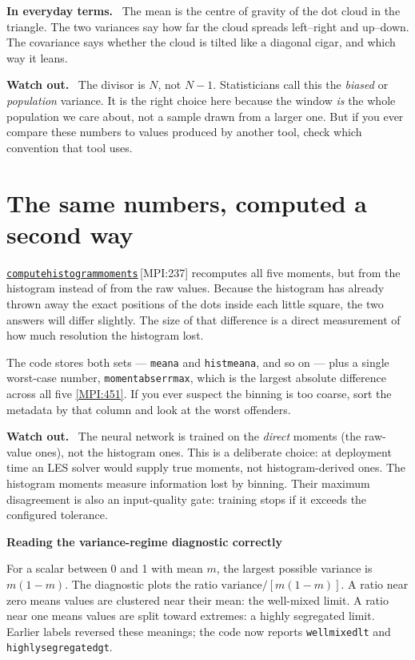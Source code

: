 \documentclass[11pt,a4paper]{report}
\newcommand{\srcbase}{vscode://file/Users/syellapa/Documents/Research/2026/ANSYS/Multi-ScalarPDF}
\newcommand{\srctag}[1]{{\footnotesize\textcolor{TagGray}{[#1]}}}
\newcommand{\Mpi}[2]{\href{\srcbase/EnsightPDFHybridDatasetMPI.py:#1}{\texttt{#2}}\,\srctag{MPI:#1}}
\newcommand{\MpiL}[1]{\href{\srcbase/EnsightPDFHybridDatasetMPI.py:#1}{\srctag{MPI:#1}}}
\newcommand{\code}[1]{\texttt{#1}}
\renewcommand{\_}{\origtextunderscore\allowbreak}
\newlength{\calloutwidth}
\newcommand{\calloutOpen}{%
  \par\medskip\noindent
  \setlength{\calloutwidth}{\dimexpr\linewidth-2\fboxsep\relax}%
  \begin{lrbox}{\calloutbox}\begin{minipage}{\calloutwidth}}
\newcommand{\calloutClose}[1]{%
  \end{minipage}\end{lrbox}\colorbox{#1}{\usebox{\calloutbox}}\par\medskip}
\newenvironment{plainbox}[1]
  {\calloutOpen\textbf{#1}\par\medskip}
  {\calloutClose{BoxBG}}
\newenvironment{analogy}
  {\calloutOpen\textbf{In everyday terms.}\ }
  {\calloutClose{BoxBG}}
\newenvironment{caution}
  {\calloutOpen\textbf{Watch out.}\ }
  {\calloutClose{WarnBG}}
\begin{document}
\begin{analogy}
The mean is the centre of gravity of the dot cloud in the triangle. The two variances say
how far the cloud spreads left--right and up--down. The covariance says whether the cloud is
tilted like a diagonal cigar, and which way it leans.
\end{analogy}

\begin{caution}
The divisor is $N$, not $N-1$. Statisticians call this the \emph{biased} or \emph{population}
variance. It is the right choice here because the window \emph{is} the whole population we
care about, not a sample drawn from a larger one. But if you ever compare these numbers to
values produced by another tool, check which convention that tool uses.
\end{caution}

\section{The same numbers, computed a second way}

\Mpi{237}{compute\_histogram\_moments} recomputes all five moments, but from the histogram
instead of from the raw values. Because the histogram has already thrown away the exact
positions of the dots inside each little square, the two answers will differ slightly. The
size of that difference is a direct measurement of how much resolution the histogram lost.

The code stores both sets --- \code{mean\_a} and \code{hist\_mean\_a}, and so on --- plus a
single worst-case number, \code{moment\_abs\_err\_max}, which is the largest absolute
difference across all five \MpiL{451}. If you ever suspect the binning is too coarse, sort
the metadata by that column and look at the worst offenders.

\begin{caution}
The neural network is trained on the \emph{direct} moments (the raw-value ones), not the
histogram ones. This is a deliberate choice: at deployment time an LES solver would supply
true moments, not histogram-derived ones. The histogram moments measure information lost by
binning. Their maximum disagreement is also an input-quality gate: training stops if it exceeds
the configured tolerance.
\end{caution}

\begin{plainbox}{Reading the variance-regime diagnostic correctly}
For a scalar between 0 and 1 with mean $m$, the largest possible variance is $m(1-m)$.
The diagnostic plots the ratio $\mathrm{variance}/[m(1-m)]$. A ratio near zero means values
are clustered near their mean: the well-mixed limit. A ratio near one means values are split
toward extremes: a highly segregated limit. Earlier labels reversed these meanings; the code
now reports \code{well\_mixed\_lt\_0\_1} and
\code{highly\_segregated\_gt\_0\_8}.
\end{plainbox}
\end{document}
